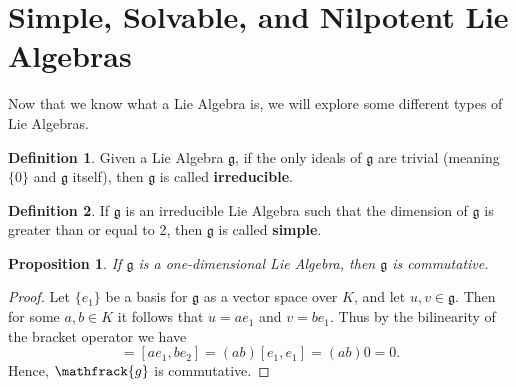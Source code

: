 \documentclass[12pt]{article}
\newtheorem{prop}{Proposition}[section]
\theoremstyle{definition}
\newtheorem{definition}{Definition}[section]
\theoremstyle{definition}
\begin{document}
    \section{Simple, Solvable, and Nilpotent Lie Algebras}
        Now that we know what a Lie Algebra is, we will explore some different
        types of Lie Algebras.
        \begin{definition}
            Given a Lie Algebra $\mathfrak{g}$, if the only ideals of
            $\mathfrak{g}$ are trivial (meaning $\{0\}$ and $\mathfrak{g}$
            itself), then $\mathfrak{g}$ is called \textbf{irreducible}.
        \end{definition}
        \begin{definition}
            If $\mathfrak{g}$ is an irreducible Lie Algebra such that the
            dimension of $\mathfrak{g}$ is greater than or equal to 2, then
            $\mathfrak{g}$  is called \textbf{simple}.
        \end{definition}
        \begin{prop}
            If $\mathfrak{g}$ is a one-dimensional Lie Algebra, then
            $\mathfrak{g}$ is commutative.
        \end{prop}
            \begin{proof}
                Let $\{e_1\}$ be a basis for $\mathfrak{g}$ as a vector space
                over $K$,  and let
                $u, v\in\mathfrak{g}$. Then for some $a, b\in K$ it follows
                that $u=ae_1$ and $v=be_1$. Thus by the bilinearity of the
                bracket operator we have 
                    \begin{equation*}
                        [u, v] = [ae_1, be_2]=(ab)[e_1, e_1]=(ab)0=0.
                    \end{equation*}
                Hence, $\mathfrack{g}$ is commutative.
            \end{proof}
\end{document}
